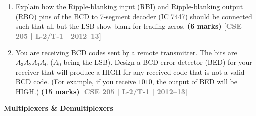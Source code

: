 \documentclass[12pt,a3paper]{article}
\newcommand{\yr}[1]{\hfill\textcolor{gray}{\small\textbf{[#1]}}}
\newcommand{\mk}[1]{\textcolor{orange!70!black}{\small\textbf{(#1 marks)}}}
\newcommand{\subtopic}[2]{%
  \vspace{10pt}
  \noindent\begin{tcolorbox}[colback=#1!8,colframe=#1,boxrule=0.6pt,arc=4pt,
    left=6pt,right=6pt,top=4pt,bottom=4pt]
    \small\bfseries\textcolor{#1}{#2}
  \end{tcolorbox}
  \vspace{2pt}
}
\begin{document}
\begin{enumerate}

\item Explain how the Ripple-blanking input (RBI) and Ripple-blanking output (RBO) pins of the BCD to 7-segment decoder (IC 7447) should be connected such that all but the LSB show blank for leading zeros.
\mk{6} \yr{CSE 205 | L-2/T-1 | 2012--13}

\item You are receiving BCD codes sent by a remote transmitter. The bits are $A_3A_2A_1A_0$ ($A_0$ being the LSB). Design a BCD-error-detector (BED) for your receiver that will produce a HIGH for any received code that is not a valid BCD code. (For example, if you receive $1010$, the output of BED will be HIGH.)
\mk{15} \yr{CSE 205 | L-2/T-1 | 2012--13}

\end{enumerate}

\subtopic{cD}{Multiplexers \& Demultiplexers}
\label{sub:s4-mux}
\end{document}
